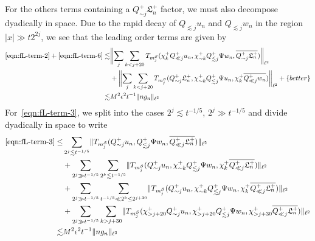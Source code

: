 \documentclass[letterpaper, reqno,final]{amsart}
\newcommand{\cS}{\mathcal{S}}
\newcommand{\fL}{\mathfrak{L}}
\newcommand{\btext}[1]{\left\{\textup{#1}\right\}}
\newcommand{\bbetter}{\btext{better}}
\begin{document}
For the others terms containing a $Q_{\sim j}^+ \fL^+_n$ factor, we must also decompose dyadically in space.  Due to the rapid decay of $Q_{\lesssim j} u_n$ and $Q_{\lesssim j} w_n$ in the region $|x| \gg t 2^{2j}$, we see that the leading order terms are given by
\begin{equation*}\begin{split}
    \eqref{eqn:fL-term-2} + \eqref{eqn:fL-term-6} \lesssim& \biggl\lVert \sum_j \sum_{k < j + 20} T_{m_j^\cS}(\chi_{k}^+ Q_{\ll j}^+ u_n, \chi_{\sim k}^+Q_{\lesssim j}^+ \Psi w_n, \overline{Q_{\sim j}^+ \fL_n^+}) \biggr\rVert_{\ell^2}\\
    &+ \biggl\lVert \sum_j \sum_{k < j + 20} T_{m_j^\cS}(Q_{\sim j}^+ \fL_n^+ , \chi_{\sim k}^+Q_{\lesssim j}^+ \Psi  u_n, \chi_k^+ \overline{Q_{\ll j}^+ w_n}) \biggr\rVert_{\ell^2} + \bbetter\\
    \lesssim& M^2\epsilon^2 t^{-1} \lVert ng_n \rVert_{\ell^2}
\end{split}
\end{equation*}
For~\eqref{eqn:fL-term-3}, we split into the cases $2^j \lesssim t^{-1/5}$, $2^{j} \gg t^{-1/5}$ and divide dyadically in space to write
\begin{equation*}\begin{split}
    \eqref{eqn:fL-term-3} \leq& \sum_{2^j \lesssim t^{-1/5}} \lVert T_{m_j^\cS}(Q_{\sim j}^+ u_n, Q_{\lesssim j}^+ \Psi w_n, \overline{Q_{\ll j}^+ \fL_n^+}) \rVert_{\ell^2}\\
    &+ \sum_{2^j \gg t^{-1/5}} \sum_{2^k \lesssim t^{-1/5}} \lVert T_{m_j^\cS}(Q_{\sim j}^+ u_n, \chi_{\sim k}^+Q_{\lesssim j}^+ \Psi w_n, \chi_k^+\overline{Q_{\ll j}^+ \fL_n^+}) \rVert_{\ell^2}\\
    &+ \sum_{2^j \gg t^{-1/5}} \sum_{t^{-1/5} \ll 2^k \leq 2^{j+30}} \lVert T_{m_j^\cS}(Q_{\sim j}^+ u_n, \chi_{\sim k}^+Q_{\lesssim j}^+ \Psi w_n, \chi_k^+\overline{Q_{\ll j}^+ \fL_n^+}) \rVert_{\ell^2}\\
    &+ \sum_{2^j \gg t^{-1/5}} \sum_{k > j + 30} \lVert T_{m_j^\cS}(\chi_{> j + 20}^+Q_{\sim j}^+ u_n, \chi_{> j + 20}^+ Q_{\lesssim j}^+ \Psi w_n, \chi_{> j + 30}^+\overline{Q_{\ll j}^+ \fL_n^+}) \rVert_{\ell^2}\\
    \lesssim& M^2 \epsilon^2 t^{-1} \lVert ng_n \rVert_{\ell^2}
\end{split}
\end{equation*}
\end{document}
